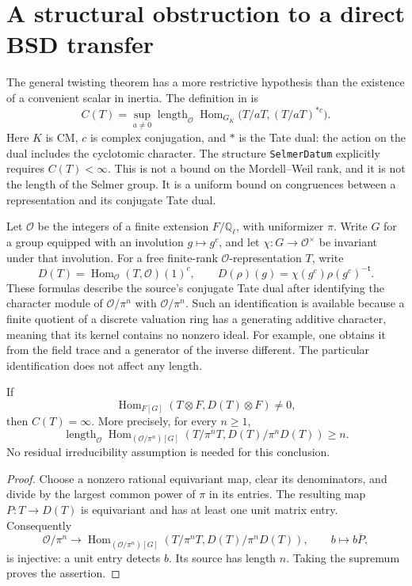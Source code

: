\section{A structural obstruction to a direct BSD transfer}
\label{sec:polarization-obstruction}

The general twisting theorem has a more restrictive hypothesis than the
existence of a convenient scalar in inertia.  The definition
 in
 is
\[
 C(T)=\sup_{a\ne0}\operatorname{length}_{\mathcal O}
 \operatorname{Hom}_{G_K}\bigl(T/aT,(T/aT)^{*c}\bigr).
\]
Here $K$ is CM, $c$ is complex conjugation, and $*$ is the Tate dual:
the action on the dual includes the cyclotomic character.  The structure
\texttt{SelmerDatum} explicitly requires $C(T)<\infty$.
This is not a bound on the Mordell--Weil rank, and it is not the length of
the Selmer group.  It is a uniform bound on congruences between a
representation and its conjugate Tate dual.

Let $\mathcal O$ be the integers of a finite extension $F/\mathbb Q_\ell$,
with uniformizer $\pi$.  Write $G$ for a group equipped with an involution
$g\mapsto g^c$, and let $\chi:G\to\mathcal O^\times$ be invariant under
that involution.  For a free finite-rank $\mathcal O$-representation $T$,
write
\[
 D(T)=\operatorname{Hom}_{\mathcal O}(T,\mathcal O)(1)^c,
 \qquad
 D(\rho)(g)=\chi(g^c)\rho(g^c)^{-\mathsf t}.
\]
These formulas describe the source's conjugate Tate dual after identifying
the character module of $\mathcal O/\pi^n$ with
$\mathcal O/\pi^n$.  Such an identification is available because a finite
quotient of a discrete valuation ring has a generating additive character,
meaning that its kernel contains no nonzero ideal.
For example, one obtains it from the field trace and a generator of the
inverse different.  The particular identification does not affect any
length.

\begin{proposition}
\label{prop:infinite-global}
If
\[
 \operatorname{Hom}_{F[G]}(T\otimes F,D(T)\otimes F)\ne0,
\]
then $C(T)=\infty$.  More precisely, for every $n\ge1$,
\[
 \operatorname{length}_{\mathcal O}
 \operatorname{Hom}_{(\mathcal O/\pi^n)[G]}
       (T/\pi^nT,D(T)/\pi^nD(T))\ge n.
\]
No residual irreducibility assumption is needed for this conclusion.
\end{proposition}
\begin{proof}
Choose a nonzero rational equivariant map, clear its denominators, and
divide by the largest common power of $\pi$ in its entries.  The resulting
map $P:T\to D(T)$ is equivariant and has at least one unit matrix entry.
Consequently
\[
 \mathcal O/\pi^n\longrightarrow
 \operatorname{Hom}_{(\mathcal O/\pi^n)[G]}
       (T/\pi^nT,D(T)/\pi^nD(T)),
 \qquad b\longmapsto b\overline P,
\]
is injective: a unit entry detects $b$.  Its source has length $n$.
Taking the supremum proves the assertion.
\end{proof}

